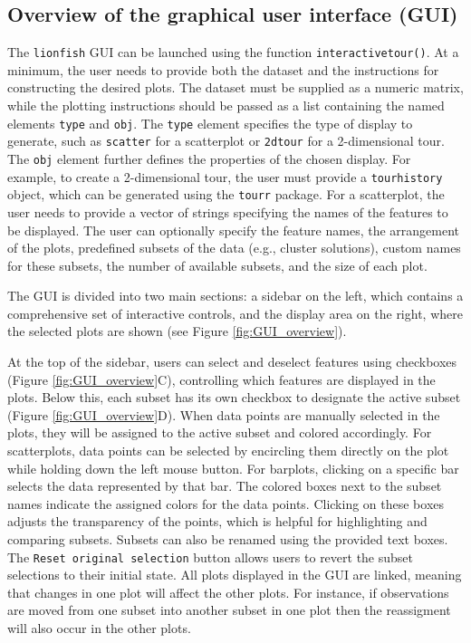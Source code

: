 \documentclass[article]{ajs}
\begin{document}
\subsection{Overview of the graphical user interface (GUI)}

The \texttt{lionfish} GUI can be launched using the function \texttt{interactive\textunderscore tour()}. At a minimum, the user needs to provide both the dataset and the instructions for constructing the desired plots. The dataset must be supplied as a numeric matrix, while the plotting instructions should be passed as a list containing the named elements \texttt{type} and \texttt{obj}. The \texttt{type} element specifies the type of display to generate, such as \texttt{scatter} for a scatterplot or \texttt{2d\textunderscore tour} for a 2-dimensional tour. The \texttt{obj} element further defines the properties of the chosen display. For example, to create a 2-dimensional tour, the user must provide a \texttt{tour\textunderscore history} object, which can be generated using the \texttt{tourr} package. For a scatterplot, the user needs to provide a vector of strings specifying the names of the features to be displayed. The user can optionally specify the feature names, the arrangement of the plots, predefined subsets of the data (e.g., cluster solutions), custom names for these subsets, the number of available subsets, and the size of each plot.

The GUI is divided into two main sections: a sidebar on the left, which contains a comprehensive set of interactive controls, and the display area on the right, where the selected plots are shown (see Figure \ref{fig:GUI_overview}).

At the top of the sidebar, users can select and deselect features using checkboxes (Figure \ref{fig:GUI_overview}C), controlling which features are displayed in the plots. Below this, each subset has its own checkbox to designate the active subset (Figure \ref{fig:GUI_overview}D). When data points are manually selected in the plots, they will be assigned to the active subset and colored accordingly. For scatterplots, data points can be selected by encircling them directly on the plot while holding down the left mouse button. For barplots, clicking on a specific bar selects the data represented by that bar. The colored boxes next to the subset names indicate the assigned colors for the data points. Clicking on these boxes adjusts the transparency of the points, which is helpful for highlighting and comparing subsets. Subsets can also be renamed using the provided text boxes. The \texttt{Reset original selection} button allows users to revert the subset selections to their initial state. All plots displayed in the GUI are linked, meaning that changes in one plot will affect the other plots. For instance, if observations are moved from one subset into another subset in one plot then the reassigment will also occur in the other plots. 
\end{document}
